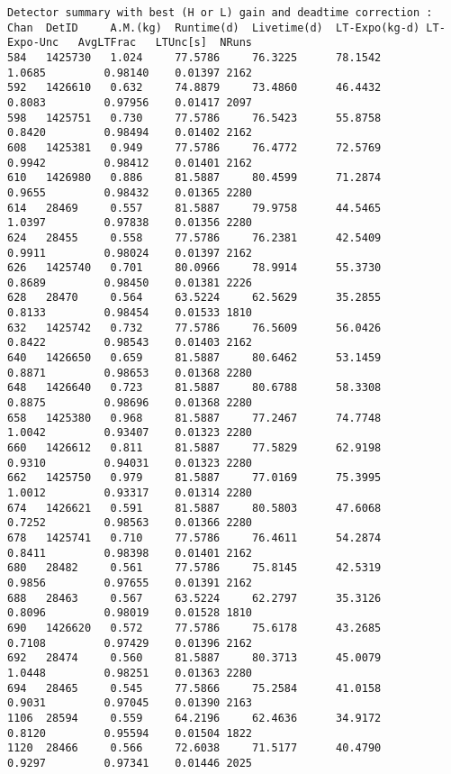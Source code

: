 \documentclass[notitlepage,rmp,aps,10pt]{revtex4-1}
\begin{document}
\begin{verbatim}
Detector summary with best (H or L) gain and deadtime correction :
Chan  DetID     A.M.(kg)  Runtime(d)  Livetime(d)  LT-Expo(kg-d) LT-Expo-Unc   AvgLTFrac   LTUnc[s]  NRuns
584   1425730   1.024     77.5786     76.3225      78.1542        1.0685         0.98140    0.01397 2162
592   1426610   0.632     74.8879     73.4860      46.4432        0.8083         0.97956    0.01417 2097
598   1425751   0.730     77.5786     76.5423      55.8758        0.8420         0.98494    0.01402 2162
608   1425381   0.949     77.5786     76.4772      72.5769        0.9942         0.98412    0.01401 2162
610   1426980   0.886     81.5887     80.4599      71.2874        0.9655         0.98432    0.01365 2280
614   28469     0.557     81.5887     79.9758      44.5465        1.0397         0.97838    0.01356 2280
624   28455     0.558     77.5786     76.2381      42.5409        0.9911         0.98024    0.01397 2162
626   1425740   0.701     80.0966     78.9914      55.3730        0.8689         0.98450    0.01381 2226
628   28470     0.564     63.5224     62.5629      35.2855        0.8133         0.98454    0.01533 1810
632   1425742   0.732     77.5786     76.5609      56.0426        0.8422         0.98543    0.01403 2162
640   1426650   0.659     81.5887     80.6462      53.1459        0.8871         0.98653    0.01368 2280
648   1426640   0.723     81.5887     80.6788      58.3308        0.8875         0.98696    0.01368 2280
658   1425380   0.968     81.5887     77.2467      74.7748        1.0042         0.93407    0.01323 2280
660   1426612   0.811     81.5887     77.5829      62.9198        0.9310         0.94031    0.01323 2280
662   1425750   0.979     81.5887     77.0169      75.3995        1.0012         0.93317    0.01314 2280
674   1426621   0.591     81.5887     80.5803      47.6068        0.7252         0.98563    0.01366 2280
678   1425741   0.710     77.5786     76.4611      54.2874        0.8411         0.98398    0.01401 2162
680   28482     0.561     77.5786     75.8145      42.5319        0.9856         0.97655    0.01391 2162
688   28463     0.567     63.5224     62.2797      35.3126        0.8096         0.98019    0.01528 1810
690   1426620   0.572     77.5786     75.6178      43.2685        0.7108         0.97429    0.01396 2162
692   28474     0.560     81.5887     80.3713      45.0079        1.0448         0.98251    0.01363 2280
694   28465     0.545     77.5866     75.2584      41.0158        0.9031         0.97045    0.01390 2163
1106  28594     0.559     64.2196     62.4636      34.9172        0.8120         0.95594    0.01504 1822
1120  28466     0.566     72.6038     71.5177      40.4790        0.9297         0.97341    0.01446 2025

\end{verbatim}
\end{document}
